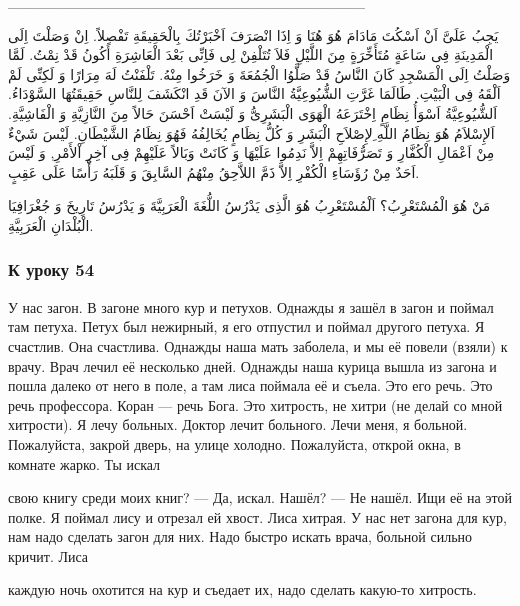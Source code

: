 \documentclass[a5paper]{article}
\begin{document}
\_\_\_\_\_\_\_\_\_\_\_\_\_\_\_\_\_\_\_\_\_\_\_\_\_\_\_\_\_\_\_\_\_\_

يَجِبُ عَلَىَّ اَنْ اَسْكُتَ مَادَامَ هُوَ هُنَا وَ اِذَا انْصَرَفَ اَخْبَرْتُكَ بِالْحَقِيقَةِ تَفْصِلاً. اِنْ وَصَلْتَ اِلَى الْمَدِينَةِ فِى سَاعَةٍ مُتَأَخِّرَةٍ مِنَ اللَّيْلِ فَلاَ تُتَلْفِنْ لِى فَاِنِّى بَعْدَ الْعَاشِرَةِ أَكُونُ قَدْ نِمْتُ. لَمَّا وَصَلْتُ اِلَى الْمَسْجِدِ كَانَ النَّاسُ قَدْ صَلَّوُا الْجُمُعَةَ وَ خَرَخُوا مِنْهُ. تَلْفَنْتُ لَهَ مِرَارًا وَ لَكِنِّى لَمْ اَلْقَهُ فِى الْبَيْتِ. طَالَمَا غَرَّتِ الشُّيُوعِيَّةُ النَّاسَ وَ الآنَ قَدِ انْكَشَفَ لِلنَّاسِ حَقِيقَتُهَا السَّوْدَاءُ. اَلشُّيُوعِيَّةُ اَسْوَأُ نِظَامٍ اِخْتَرَعَهُ الْهَوَى الْبَشَرِىُّ وَ لَيْسَتْ اَحْسَنَ حَالاً مِنَ النَّازِيَّةِ وَ الْفَاشِيَّةِ. اَلإِسْلاَمُ هُوَ نِظَامُ اللَّهِ ِلإِصْلاَحِ الْبَشَرِ وَ كُلُّ نِظَامٍ يُخَالِفُهُ فَهُوَ نِظَامُ الشَّيْطَانِ. لَيْسَ شَيْءٌ مِنْ اَعْمَالِ الْكُفَّارِ وَ تَصَرُّفَاتِهِمْ اِلاَّ نَدِمُوا عَلَيْهَا وَ كَانَتْ وَبَالاً عَلَيْهِمْ فِى آخِرِ اْلأَمْرِ, وَ لَيْسَ اَحَدٌ مِنْ رُؤَسَاءِ الْكُفْرِ اِلاَّ ذَمَّ اللاَّحِقُ مِنْهُمُ السَّابِقَ وَ قَلَبَهُ رَأْسًا عَلَى عَقِبٍ.

مَنْ هُوَ الْمُسْتَعْرِبُ؟ اَلْمُسْتَعْرِبُ هُوَ الَّذِى يَدْرُسُ اللُّغَةَ الْعَرَبِيَّةَ وَ يَدْرُسُ تَارِيخَ وَ جُغْرَافِيَا الْبُلْدَانِ الْعَرَبِيَّةِ.

\subsubsection{К уроку 54}
У нас загон. В загоне много кур и петухов. Однажды я зашёл в загон и поймал там петуха. Петух был нежирный, я его отпустил и поймал другого петуха. Я счастлив. Она счастлива. Однажды наша мать заболела, и мы её повели (взяли) к врачу. Врач лечил её несколько дней. Однажды наша курица вышла из загона и пошла далеко от него в поле, а там лиса поймала её и съела. Это его речь. Это речь профессора. Коран — речь Бога. Это хитрость, не хитри (не делай со мной хитрости). Я лечу больных. Доктор лечит больного. Лечи меня, я больной. Пожалуйста, закрой дверь, на улице холодно. Пожалуйста, открой окна, в комнате жарко. Ты искал

свою книгу среди моих книг? — Да, искал. Нашёл? — Не нашёл. Ищи её на этой полке. Я поймал лису и отрезал ей хвост. Лиса хитрая. У нас нет загона для кур, нам надо сделать загон для них. Надо быстро искать врача, больной сильно кричит. Лиса

каждую ночь охотится на кур и съедает их, надо сделать какую-то хитрость.
\end{document}
